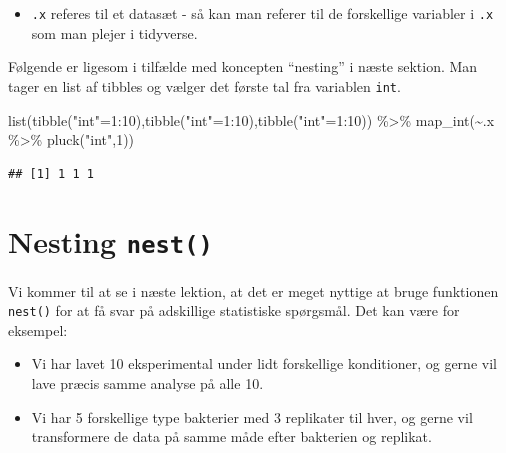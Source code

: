 \documentclass[
]{book}
\newenvironment{Shaded}{\begin{snugshade}}{\end{snugshade}}
\newcommand{\DecValTok}[1]{\textcolor[rgb]{0.00,0.00,0.81}{#1}}
\newcommand{\FunctionTok}[1]{\textcolor[rgb]{0.00,0.00,0.00}{#1}}
\newcommand{\NormalTok}[1]{#1}
\newcommand{\OtherTok}[1]{\textcolor[rgb]{0.56,0.35,0.01}{#1}}
\newcommand{\SpecialCharTok}[1]{\textcolor[rgb]{0.00,0.00,0.00}{#1}}
\newcommand{\StringTok}[1]{\textcolor[rgb]{0.31,0.60,0.02}{#1}}
\providecommand{\tightlist}{%
  \setlength{\itemsep}{0pt}\setlength{\parskip}{0pt}}
\begin{document}
\begin{itemize}
\tightlist
\item
  \texttt{.x} referes til et datasæt - så kan man referer til de forskellige variabler i \texttt{.x} som man plejer i tidyverse.
\end{itemize}

Følgende er ligesom i tilfælde med koncepten ``nesting'' i næste sektion. Man tager en list af tibbles og vælger det første tal fra variablen \texttt{int}.

\begin{Shaded}
\begin{Highlighting}[]
\FunctionTok{list}\NormalTok{(}\FunctionTok{tibble}\NormalTok{(}\StringTok{"int"}\OtherTok{=}\DecValTok{1}\SpecialCharTok{:}\DecValTok{10}\NormalTok{),}\FunctionTok{tibble}\NormalTok{(}\StringTok{"int"}\OtherTok{=}\DecValTok{1}\SpecialCharTok{:}\DecValTok{10}\NormalTok{),}\FunctionTok{tibble}\NormalTok{(}\StringTok{"int"}\OtherTok{=}\DecValTok{1}\SpecialCharTok{:}\DecValTok{10}\NormalTok{)) }\SpecialCharTok{\%\textgreater{}\%} 
  \FunctionTok{map\_int}\NormalTok{(}\SpecialCharTok{\textasciitilde{}}\NormalTok{.x }\SpecialCharTok{\%\textgreater{}\%} \FunctionTok{pluck}\NormalTok{(}\StringTok{"int"}\NormalTok{,}\DecValTok{1}\NormalTok{))}
\end{Highlighting}
\end{Shaded}

\begin{verbatim}
## [1] 1 1 1
\end{verbatim}

\hypertarget{nesting-nest}{%
\section{\texorpdfstring{Nesting \texttt{nest()}}{Nesting nest()}}\label{nesting-nest}}

Vi kommer til at se i næste lektion, at det er meget nyttige at bruge funktionen \texttt{nest()} for at få svar på adskillige statistiske spørgsmål. Det kan være for eksempel:

\begin{itemize}
\tightlist
\item
  Vi har lavet 10 eksperimental under lidt forskellige konditioner, og gerne vil lave præcis samme analyse på alle 10.
\item
  Vi har 5 forskellige type bakterier med 3 replikater til hver, og gerne vil transformere de data på samme måde efter bakterien og replikat.
\end{itemize}
\end{document}
